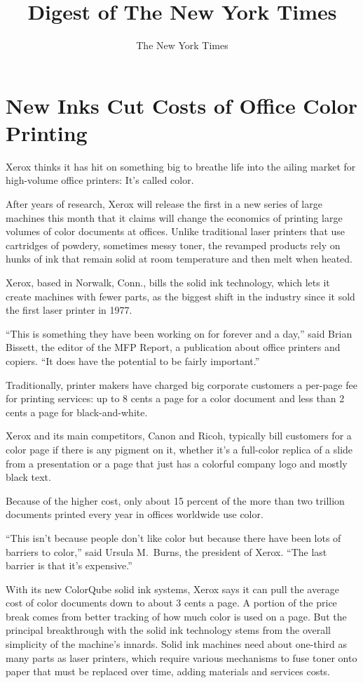 \documentclass[12pt,a4paper,onecolumn]{article}
\title{Digest of The New York Times}
\author{The New York Times}
\begin{document}
\date{}

\tableofcontents
\pagebreak
\section{New Inks Cut Costs of Office Color Printing}

Xerox thinks it has hit on something big to breathe life into the ailing market for high-volume
office printers: It's called color.

After years of research, Xerox will release the first in a new series of large machines this month
that it claims will change the economics of printing large volumes of color documents at offices.
Unlike traditional laser printers that use cartridges of powdery, sometimes messy toner, the
revamped products rely on hunks of ink that remain solid at room temperature and then melt when
heated.

Xerox, based in Norwalk, Conn., bills the solid ink technology, which lets it create machines with
fewer parts, as the biggest shift in the industry since it sold the first laser printer in 1977.

``This is something they have been working on for forever and a day,'' said Brian Bissett, the
editor of the MFP Report, a publication about office printers and copiers. ``It does have the
potential to be fairly important.''

Traditionally, printer makers have charged big corporate customers a per-page fee for printing
services: up to 8 cents a page for a color document and less than 2 cents a page for
black-and-white.

Xerox and its main competitors, Canon and Ricoh, typically bill customers for a color page if there
is any pigment on it, whether it's a full-color replica of a slide from a presentation or a page
that just has a colorful company logo and mostly black text.

Because of the higher cost, only about 15 percent of the more than two trillion documents printed
every year in offices worldwide use color.

``This isn't because people don't like color but because there have been lots of barriers to
color,'' said Ursula M.~Burns, the president of Xerox. ``The last barrier is that it's expensive.''

With its new ColorQube solid ink systems, Xerox says it can pull the average cost of color documents
down to about 3 cents a page. A portion of the price break comes from better tracking of how much
color is used on a page. But the principal breakthrough with the solid ink technology stems from the
overall simplicity of the machine's innards. Solid ink machines need about one-third as many parts
as laser printers, which require various mechanisms to fuse toner onto paper that must be replaced
over time, adding materials and services costs.
\end{document}
